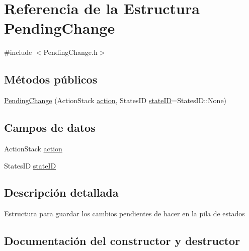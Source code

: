\hypertarget{structPendingChange}{}\section{Referencia de la Estructura Pending\+Change}
\label{structPendingChange}


{\ttfamily \#include $<$Pending\+Change.\+h$>$}

\subsection*{Métodos públicos}
\begin{DoxyCompactItemize}
\item 
\hyperlink{structPendingChange_a61fb7f911e961d1e63a26ff92cc395e8}{Pending\+Change} (Action\+Stack \hyperlink{structPendingChange_afa46a2cd704ab8d14aabdceb2270e012}{action}, States\+I\+D \hyperlink{structPendingChange_ae91440b55b46e766b964b0c8fa08abdb}{state\+I\+D}=States\+I\+D\+::\+None)
\end{DoxyCompactItemize}
\subsection*{Campos de datos}
\begin{DoxyCompactItemize}
\item 
Action\+Stack \hyperlink{structPendingChange_afa46a2cd704ab8d14aabdceb2270e012}{action}
\item 
States\+I\+D \hyperlink{structPendingChange_ae91440b55b46e766b964b0c8fa08abdb}{state\+I\+D}
\end{DoxyCompactItemize}


\subsection{Descripción detallada}
Estructura para guardar los cambios pendientes de hacer en la pila de estados 

\subsection{Documentación del constructor y destructor}
\hypertarget{structPendingChange_a61fb7f911e961d1e63a26ff92cc395e8}{}
